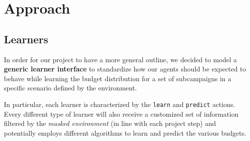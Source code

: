 \section{Approach}
\label{sec:intro_approach}

\subsection{Learners}

In order for our project to have a more general outline, we decided to model a \textbf{generic learner interface} to standardize how our agents should be expected to behave while learning the budget distribution for a set of subcampaigns in a specific scenario defined by the environment.

In particular, each learner is characterized by the \texttt{learn} and \texttt{predict} actions.
Every different type of learner will also receive a customized set of information filtered by the \textit{masked environment} (in line with each project step) and potentially employs different algorithms to learn and predict the various budgets.

